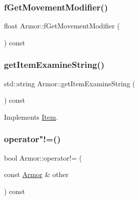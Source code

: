 \mbox{\label{class_armor_a788fee5745a82a7ffc587aa4938200dc}} 
\subsubsection{\texorpdfstring{f\+Get\+Movement\+Modifier()}{fGetMovementModifier()}}
{\footnotesize\ttfamily float Armor\+::f\+Get\+Movement\+Modifier (\begin{DoxyParamCaption}{ }\end{DoxyParamCaption}) const}

\mbox{\label{class_armor_a731bb4d1fe53070f30a336db82fada2c}} 
\subsubsection{\texorpdfstring{get\+Item\+Examine\+String()}{getItemExamineString()}}
{\footnotesize\ttfamily std\+::string Armor\+::get\+Item\+Examine\+String (\begin{DoxyParamCaption}{ }\end{DoxyParamCaption}) const\hspace{0.3cm}{\ttfamily [virtual]}}



Implements \mbox{\hyperlink{class_item_a00e06647e1adeb62f2d95044476126ac}{Item}}.

\mbox{\label{class_armor_a912e1ad6bfe7509c66c2c4966cf5188c}} 
\subsubsection{\texorpdfstring{operator"!=()}{operator!=()}}
{\footnotesize\ttfamily bool Armor\+::operator!= (\begin{DoxyParamCaption}\item[{const \mbox{\hyperlink{class_armor}{Armor}} \&}]{other }\end{DoxyParamCaption}) const}

\mbox{\label{class_armor_ad706d994c7d3a3ea4d7c1728faccc0aa}} 

